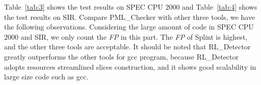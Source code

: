 Table~\ref{tab:3} shows the test results on SPEC CPU $2000$ and Table~\ref{tab:4} shows the test results on SIR. Compare PML\_Checker with other three tools, we have the following observations. 
Considering the large amount of code in SPEC CPU $2000$ and SIR, we only count the \textit{FP} in this part. The \textit{FP} of Splint is highest, and the other three tools are acceptable. It should be noted that RL\_Detector greatly outperforms the other tools for gcc program, because RL\_Detector adopts resources streamlined slices construction, and it shows good scalability in large size code such as gcc.





